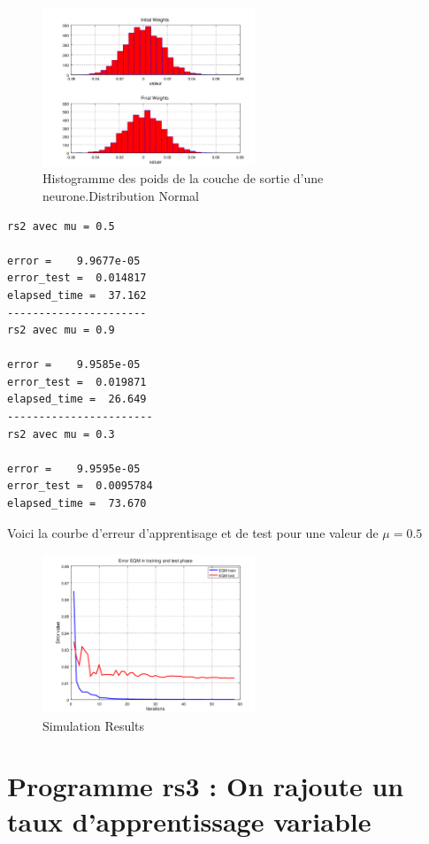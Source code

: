 \documentclass[journal]{IEEEtran}
\begin{document}
\begin{figure}[h]
	\centering
	\includegraphics[width=2.5in]{../OctaveNeurons/rs23}
	\caption{Histogramme des poids de la couche de sortie d'une neurone.Distribution Normal }
\label{fig:histoW}
\end{figure}

\begin{lstlisting}
rs2 avec mu = 0.5

error =    9.9677e-05
error_test =  0.014817
elapsed_time =  37.162
----------------------
rs2 avec mu = 0.9

error =    9.9585e-05
error_test =  0.019871
elapsed_time =  26.649
-----------------------
rs2 avec mu = 0.3

error =    9.9595e-05
error_test =  0.0095784
elapsed_time =  73.670
\end{lstlisting}

Voici la courbe d'erreur d'apprentisage et de test pour une valeur de $\mu=0.5$ 
\begin{figure}[h]
	\centering
	\includegraphics[width=2.5in]{../OctaveNeurons/rs21}
	\caption{Simulation Results}
	\label{fig_sim}
\end{figure}


\section{Programme rs3 : On rajoute un taux d'apprentissage variable}\blindtext
\end{document}
